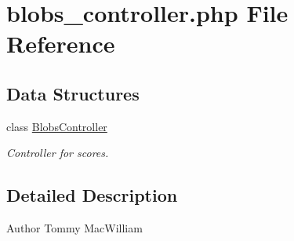 \hypertarget{blobs__controller_8php}{
\section{blobs\_\-controller.php File Reference}
\label{blobs__controller_8php}
}
\subsection*{Data Structures}
\begin{DoxyCompactItemize}
\item 
class \hyperlink{class_blobs_controller}{BlobsController}
\begin{DoxyCompactList}\small\item\em Controller for scores. \item\end{DoxyCompactList}\end{DoxyCompactItemize}


\subsection{Detailed Description}
\begin{DoxyAuthor}{Author}
Tommy MacWilliam 
\end{DoxyAuthor}

